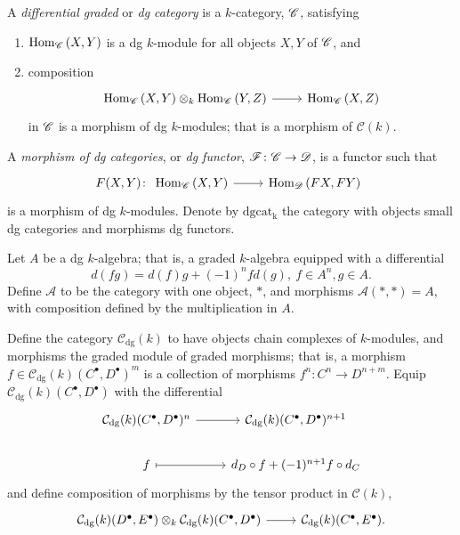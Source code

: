 \documentclass[dissertation.tex]{subfiles}
\begin{document}
\begin{defn}
  A {\it differential graded} or {\it dg category} is a $k$-category, $\mathscr{C}$, satisfying
  \begin{enumerate}
  \item
    $\operatorname{Hom}_{\mathscr{C}}\left(X,Y\right)$ is a dg $k$-module for all objects $X,Y$ of $\mathscr{C}$, and
  \item
    composition 
    $$\begin{tikzcd}
      \Hom{\CC}{X,Y} \otimes_k \Hom{\CC}{Y,Z} \arrow{r} & \Hom{\CC}{X,Z}
    \end{tikzcd}$$
    in $\mathscr{C}$ is a morphism of dg $k$-modules;
    that is a morphism of $\mathcal{C}(k)$.
  \end{enumerate}
  
  A {\it morphism of dg categories}, or {\it dg functor}, $\mathscr{F} \colon \mathscr{C} \rightarrow \mathscr{D}$, is a functor such that
  $$F(X,Y) \colon 
  \begin{tikzcd}
    \Hom{\CC}{X,Y} \arrow{r} & \Hom{\D}{FX,FY}
  \end{tikzcd}$$
  is a morphism of dg $k$-modules.
  Denote by $\operatorname{dgcat_k}$ the category with objects small dg categories and morphisms dg functors.
\end{defn}

\begin{eg}
  \begin{description}[style=nextline]
  \item[dg category with one object]
    Let $A$ be a dg $k$-algebra; that is, a graded $k$-algebra equipped with a differential
    $$d(fg) = d(f)g + (-1)^nfd(g),\ f \in A^n, g \in A.$$
    Define $\mathscr{A}$ to be the category with one object, $\ast$, and morphisms $\mathscr{A}(\ast, \ast) = A$, with composition defined by the multiplication in $A$.
  \item[dg $k$-modules]
    Define the category $\mathcal{C}_\text{dg}(k)$ to have objects chain complexes of $k$-modules, and morphisms the graded module of graded morphisms; that is, a morphism $f \in \mathcal{C}_\text{dg}(k)(C^\bullet, D^\bullet)^m$ is a collection of morphisms $f^n \colon C^n \rightarrow D^{n+m}$.
    Equip $\mathcal{C}_\text{dg}(k)(C^\bullet, D^\bullet)$ with the differential
    $$\begin{tikzcd}
      \mathcal{C}_\text{dg}(k)(C^\bullet, D^\bullet)^n \arrow{r} & \mathcal{C}_\text{dg}(k)(C^\bullet, D^\bullet)^{n+1}\\
      f \arrow[mapsto]{r} & d_D \circ f + (-1)^{n+1}f \circ d_C
    \end{tikzcd}$$
    and define composition of morphisms by the tensor product in $\mathcal{C}(k)$,
    $$\begin{tikzcd}
      \mathcal{C}_\text{dg}(k)(D^\bullet, E^\bullet) \otimes_k \mathcal{C}_\text{dg}(k)(C^\bullet, D^\bullet) \arrow{r} & \mathcal{C}_\text{dg}(k)(C^\bullet, E^\bullet).
    \end{tikzcd}$$
  \end{description}
\end{eg}
\end{document}
